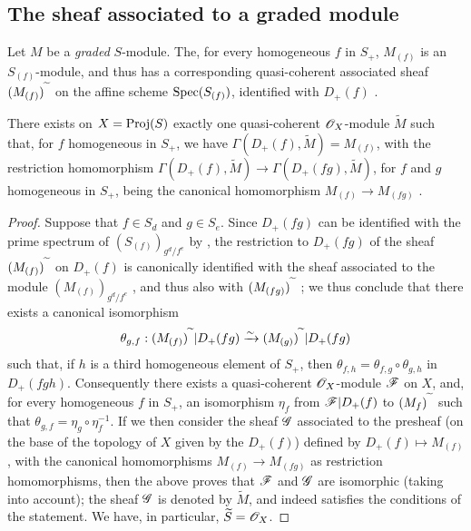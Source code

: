 \subsection{The sheaf associated to a graded module}
\label{subsection:II.2.5}

\begin{env}[2.5.1]
\label{II.2.5.1}
Let $M$ be a \emph{graded} $S$-module.
The, for every homogeneous $f$ in $S_+$, $M_{(f)}$ is an $S_{(f)}$-module, and thus has a corresponding quasi-coherent associated sheaf $(M_{(f)})^{\,\widetilde{\,}\,}$ on the affine scheme $\operatorname{Spec}(S_{(f)})$, identified with $D_+(f)$ .
\end{env}

\begin{proposition}[2.5.2]
\label{II.2.5.2}
There exists on $X=\operatorname{Proj}(S)$ exactly one quasi-coherent $\mathscr{O}_X$-module $\widetilde{M}$ such that, for $f$ homogeneous in $S_+$, we have $\Gamma(D_+(f),\widetilde{M})=M_{(f)}$, with the restriction homomorphism $\Gamma(D_+(f),\widetilde{M})\to\Gamma(D_+(fg),\widetilde{M})$, for $f$ and $g$ homogeneous in $S_+$, being the canonical homomorphism $M_{(f)}\to M_{(fg)}$ .
\end{proposition}

\begin{proof}
Suppose that $f\in S_d$ and $g\in S_e$.
Since $D_+(fg)$ can be identified with the prime spectrum of $(S_{(f)})_{g^d/f^e}$ by , the restriction to $D_+(fg)$ of the sheaf $(M_{(f)})^{\,\widetilde{\,}\,}$ on $D_+(f)$ is canonically identified with the sheaf associated to the module $(M_{(f)})_{g^d/f^e}$ , and thus also with $(M_{(fg)})^{\,\widetilde{\,}\,}$ ;
we thus conclude that there exists a canonical isomorphism
\[
  \theta_{g,f}: (M_{(f)})^{\,\widetilde{\,}\,}|D_+(fg) \xrightarrow{\sim} (M_{(g)})^{\,\widetilde{\,}\,}|D_+(fg)
\]
such that, if $h$ is a third homogeneous element of $S_+$, then $\theta_{f,h}=\theta_{f,g}\circ\theta_{g,h}$ in $D_+(fgh)$.
Consequently  there exists a quasi-coherent $\mathscr{O}_X$-module $\mathscr{F}$ on $X$, and, for every homogeneous $f$ in $S_+$, an isomorphism $\eta_f$ from $\mathscr{F}|D_+(f)$ to $(M_{f})^{\,\widetilde{\,}\,}$ such that $\theta_{g,f}=\eta_g\circ\eta_f^{-1}$.
If we then consider the sheaf $\mathscr{G}$ associated to the presheaf (on the base of the topology of $X$ given by the $D_+(f)$) defined by $D_+(f)\mapsto M_{(f)}$, with the canonical homomorphisms $M_{(f)}\to M_{(fg)}$ as restriction homomorphisms, then the above proves that $\mathscr{F}$ and $\mathscr{G}$ are isomorphic (taking  into account);
the sheaf $\mathscr{G}$ is denoted by $\widetilde{M}$, and indeed satisfies the conditions of the statement.
We have, in particular, $\widetilde{S}=\mathscr{O}_X$.
\end{proof}

